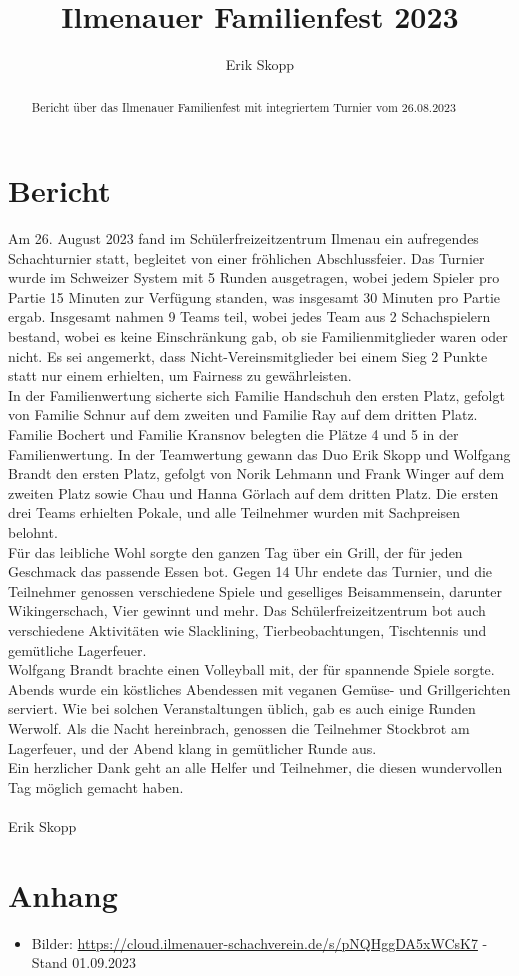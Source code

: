 \documentclass[a4paper,german]{tui-algo-seminar}
\title{Ilmenauer Familienfest 2023}
\author{Erik Skopp}
\begin{document}
\maketitle

\begin{abstract}
Bericht über das Ilmenauer Familienfest mit integriertem Turnier vom 26.08.2023
\end{abstract}

\section{Bericht}
Am 26. August 2023 fand im Schülerfreizeitzentrum Ilmenau ein aufregendes Schachturnier statt, begleitet von einer fröhlichen Abschlussfeier. Das Turnier wurde im Schweizer System mit 5 Runden ausgetragen, wobei jedem Spieler pro Partie 15 Minuten zur Verfügung standen, was insgesamt 30 Minuten pro Partie ergab. Insgesamt nahmen 9 Teams teil, wobei jedes Team aus 2 Schachspielern bestand, wobei es keine Einschränkung gab, ob sie Familienmitglieder waren oder nicht. Es sei angemerkt, dass Nicht-Vereinsmitglieder bei einem Sieg 2 Punkte statt nur einem erhielten, um Fairness zu gewährleisten.\\
In der Familienwertung sicherte sich Familie Handschuh den ersten Platz, gefolgt von Familie Schnur auf dem zweiten und Familie Ray auf dem dritten Platz. Familie Bochert und Familie Kransnov belegten die Plätze 4 und 5 in der Familienwertung. In der Teamwertung gewann das Duo Erik Skopp und Wolfgang Brandt den ersten Platz, gefolgt von Norik Lehmann und Frank Winger auf dem zweiten Platz sowie Chau und Hanna Görlach auf dem dritten Platz. Die ersten drei Teams erhielten Pokale, und alle Teilnehmer wurden mit Sachpreisen belohnt.\\
Für das leibliche Wohl sorgte den ganzen Tag über ein Grill, der für jeden Geschmack das passende Essen bot. Gegen 14 Uhr endete das Turnier, und die Teilnehmer genossen verschiedene Spiele und geselliges Beisammensein, darunter Wikingerschach, Vier gewinnt und mehr. Das Schülerfreizeitzentrum bot auch verschiedene Aktivitäten wie Slacklining, Tierbeobachtungen, Tischtennis und gemütliche Lagerfeuer.\\
Wolfgang Brandt brachte einen Volleyball mit, der für spannende Spiele sorgte. Abends wurde ein köstliches Abendessen mit veganen Gemüse- und Grillgerichten serviert. Wie bei solchen Veranstaltungen üblich, gab es auch einige Runden Werwolf. Als die Nacht hereinbrach, genossen die Teilnehmer Stockbrot am Lagerfeuer, und der Abend klang in gemütlicher Runde aus.\\
Ein herzlicher Dank geht an alle Helfer und Teilnehmer, die diesen wundervollen Tag möglich gemacht haben.\\ 
\\
Erik Skopp

\section{Anhang}
\begin{itemize}
    \item Bilder: \url{https://cloud.ilmenauer-schachverein.de/s/pNQHggDA5xWCsK7} - Stand 01.09.2023
\end{itemize}
\end{document}
